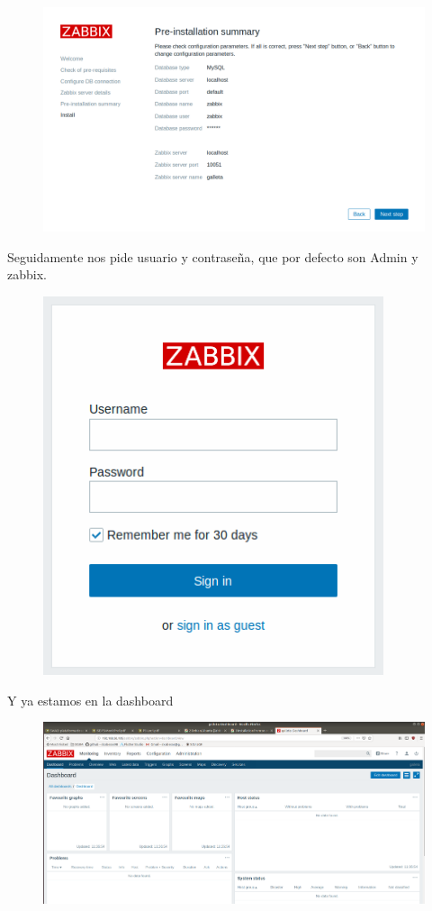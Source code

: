 \documentclass{article}
\begin{document}
\begin{figure}[H]
  \centering
  \includegraphics[width=140mm]{screenshots/frontend-summary}
\end{figure}

Seguidamente nos pide usuario y contraseña, que por defecto son Admin
y zabbix.

\begin{figure}[H]
  \centering
  \includegraphics[width=100mm]{screenshots/login}
\end{figure}

Y ya estamos en la dashboard

\begin{figure}[H]
  \centering
  \includegraphics[width=140mm]{screenshots/dashboard}
\end{figure}
\end{document}
